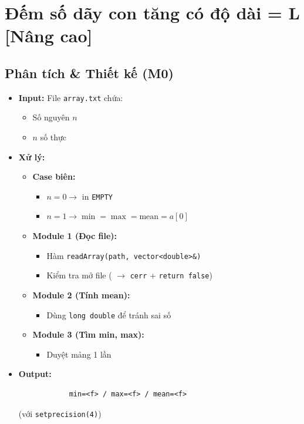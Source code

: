 \section{Đếm số dãy con tăng có độ dài = L [Nâng cao]}
\subsection{Phân tích \& Thiết kế (M0)}
    \begin{itemize}
    \item \textbf{Input:}
    File \texttt{array.txt} chứa:
    \begin{itemize}
        \item Số nguyên $n$
        \item $n$ số thực
    \end{itemize}

    \item \textbf{Xử lý:}
        \begin{itemize}
            \item \textbf{Case biên:}
            \begin{itemize}
                \item $n = 0 \rightarrow$ in \texttt{EMPTY}
                \item $n = 1 \rightarrow \min = \max = \text{mean} = a[0]$
            \end{itemize}
            
            \item \textbf{Module 1 (Đọc file):}
            \begin{itemize}
                \item Hàm \texttt{readArray(path, vector<double>\&)}
                \item Kiểm tra mở file ( $\rightarrow$ \texttt{cerr} + \texttt{return false})
            \end{itemize}
            
            \item \textbf{Module 2 (Tính mean):}
            \begin{itemize}
                \item Dùng \texttt{long double} để tránh sai số
            \end{itemize}
            
            \item \textbf{Module 3 (Tìm min, max):}
            \begin{itemize}
                \item Duyệt mảng 1 lần
            \end{itemize}
        \end{itemize}

        \item \textbf{Output:}
        \begin{lstlisting}
            min=<f> / max=<f> / mean=<f>\end{lstlisting} 
        (với \texttt{setprecision(4)})
    \end{itemize}

